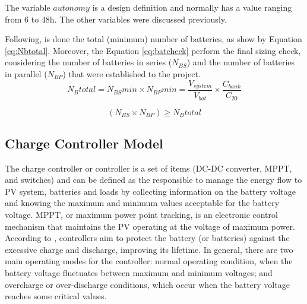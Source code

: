 \documentclass[journal]{IEEEtran}
\begin{document}
The variable $ autonomy $ is a design definition and normally has a value ranging from 6 to 48h. The other variables were discussed previously.

Following, is done the total (minimum) number of batteries, as show by Equation \ref{eq:Nbtotal}. Moreover, the Equation \ref{eq:batcheck} perform the final sizing check, considering the number of batteries in series ($ N_{BS} $) and the number of batteries in parallel ($ N_{BP} $) that were established to the project.
\begin{equation}
\label{eq:Nbtotal}
N_{B}total = N_{BS}min \times N_{BP}min = \dfrac{V_{system}}{V_{bat}} \times \dfrac{C_{bank}}{C_{20}}
\end{equation}

\begin{equation}
\label{eq:batcheck}
\left( N_{BS} \times  N_{BP} \right) \geq N_{B}total
\end{equation}

\subsection{Charge Controller Model}

The charge controller or controller is a set of items (DC-DC converter, MPPT, and switches) and can be defined as the responsible to manage the energy flow to PV system, batteries and loads by collecting information on the battery voltage and knowing the maximum and minimum values acceptable for the battery voltage. MPPT, or maximum power point tracking, is an electronic control mechanism that maintains the PV operating at the voltage of maximum power. According to \cite{Pinho}, controllers aim to protect the battery (or batteries) against the excessive charge and discharge, improving its lifetime. 
%
%
%
%
In general, there are two main operating modes for the controller: normal operating condition, when the battery voltage fluctuates between maximum and minimum voltages; and overcharge or over-discharge conditions, which occur when the battery voltage reaches some critical values. 
\end{document}
